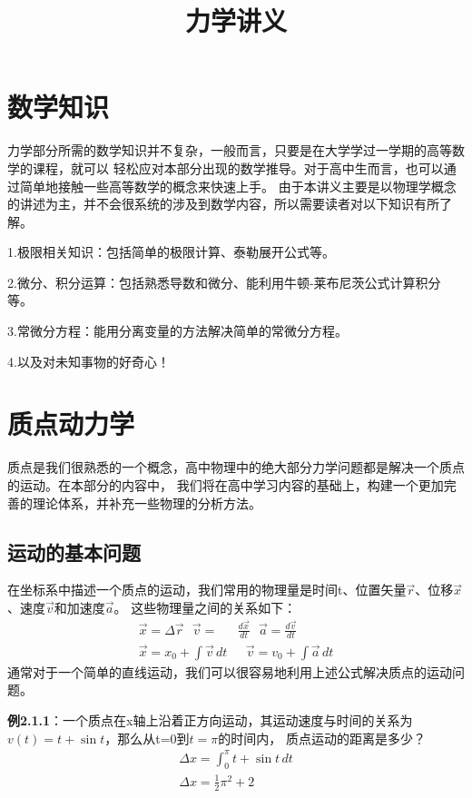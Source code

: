 \documentclass{article}
\title{\bfseries \Huge 力学讲义}  %
\author{}  %
\date{}  %
\begin{document}
  
\maketitle
\tableofcontents
\newpage

\section{数学知识}
    力学部分所需的数学知识并不复杂，一般而言，只要是在大学学过一学期的高等数学的课程，就可以
    轻松应对本部分出现的数学推导。对于高中生而言，也可以通过简单地接触一些高等数学的概念来快速上手。
    由于本讲义主要是以物理学概念的讲述为主，并不会很系统的涉及到数学内容，所以需要读者对以下知识有所了解。

    1.极限相关知识：包括简单的极限计算、泰勒展开公式等。

    2.微分、积分运算：包括熟悉导数和微分、能利用牛顿-莱布尼茨公式计算积分等。

    3.常微分方程：能用分离变量的方法解决简单的常微分方程。

    4.以及对未知事物的好奇心！

\section{质点动力学}
    质点是我们很熟悉的一个概念，高中物理中的绝大部分力学问题都是解决一个质点的运动。在本部分的内容中，
    我们将在高中学习内容的基础上，构建一个更加完善的理论体系，并补充一些物理的分析方法。

\subsection{运动的基本问题}
    在坐标系中描述一个质点的运动，我们常用的物理量是时间t、位置矢量\(\vec{r}\)、位移\(\vec{x}\)、速度\(\vec{v}\)和加速度\(\vec{a}\)。
    这些物理量之间的关系如下：
    \begin{align*}
        \vec{x} = \varDelta \vec{r}\ \ \  \vec{v}  = &\frac{d\vec{x}}{dt}\ \ \ \vec{a} = \frac{d\vec{v}}{dt} \\
        \vec{x} = x_0 + \int \vec{v} \,dt & \ \ \ \vec{v} = v_0 + \int \vec{a} \,dt 
    \end{align*}
    通常对于一个简单的直线运动，我们可以很容易地利用上述公式解决质点的运动问题。

    \textbf{例2.1.1}：一个质点在x轴上沿着正方向运动，其运动速度与时间的关系为\(v(t)=t+\sin t\)，那么从t=0到\(t=\pi\)的时间内，
    质点运动的距离是多少？
    \begin{align*}
        \varDelta x = \int_0^{\pi} t+\sin t \,dt \\
        \varDelta x = \frac{1}{2}\pi^2 + 2
    \end{align*}
\end{document}

